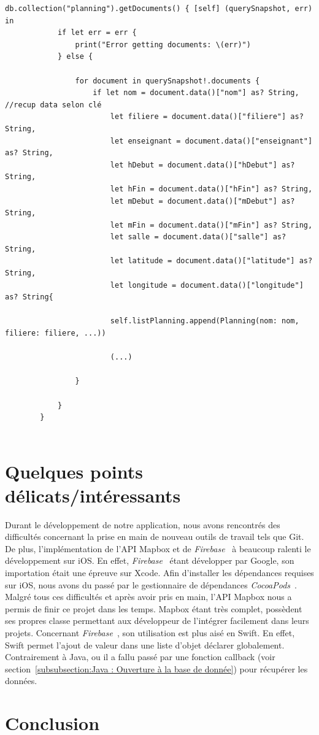 \documentclass{article}
\begin{document}
\begin{verbatim}
db.collection("planning").getDocuments() { [self] (querySnapshot, err) in
            if let err = err {
                print("Error getting documents: \(err)")
            } else {
                
                for document in querySnapshot!.documents {
                    if let nom = document.data()["nom"] as? String,         //recup data selon clé
                        let filiere = document.data()["filiere"] as? String,
                        let enseignant = document.data()["enseignant"] as? String,
                        let hDebut = document.data()["hDebut"] as? String,
                        let hFin = document.data()["hFin"] as? String,
                        let mDebut = document.data()["mDebut"] as? String,
                        let mFin = document.data()["mFin"] as? String,
                        let salle = document.data()["salle"] as? String,
                        let latitude = document.data()["latitude"] as? String,
                        let longitude = document.data()["longitude"] as? String{
                    
                        self.listPlanning.append(Planning(nom: nom, filiere: filiere, ...))
                        
                        (...)
                    
                }
                
            }
        }


\end{verbatim}

\newpage %


\section{Quelques points délicats/intéressants}

Durant le développement de notre application, nous avons rencontrés des difficultés concernant la prise en main
de nouveau outils de travail tels que Git.
De plus, l'implémentation de l'API Mapbox et de \textit{Firebase}~\cite{firebaseDoc} à beaucoup ralenti
le développement sur iOS. En effet, \textit{Firebase}~\cite{firebaseDoc} étant développer par Google, son importation
était une épreuve sur Xcode. Afin d'installer les dépendances requises sur iOS, nous avons du passé par
le gestionnaire de dépendances \textit{CocoaPods}~\cite{cocoapodsDoc}.
Malgré tous ces difficultés et après avoir pris en main, l'API Mapbox nous a permis de finir ce projet dans les temps.
Mapbox étant très complet, possèdent ses propres classe permettant aux développeur de l'intégrer facilement dans leurs
projets.
Concernant \textit{Firebase}~\cite{firebaseDoc}, son utilisation est plus aisé en Swift. En effet, Swift permet
l'ajout de valeur dans une liste d'objet déclarer globalement. Contrairement à Java, ou il a fallu passé par une
fonction callback (voir section~\ref{subsubsection:Java : Ouverture à la base de donnée}) pour récupérer les données.



\section{Conclusion}




\end{document}
